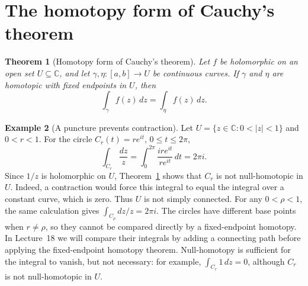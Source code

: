 \documentclass[11pt]{article}
\theoremstyle{plain}
\newtheorem{theorem}{Theorem}[section]
\theoremstyle{definition}
\newtheorem{example}[theorem]{Example}
\theoremstyle{remark}
\numberwithin{equation}{section}
\newcommand{\C}{\mathbb{C}}
\begin{document}
\newpage
\section{The homotopy form of Cauchy's theorem}
\begin{theorem}[Homotopy form of Cauchy's theorem]\label{thm:homotopy}
Let $f$ be holomorphic on an open set $U\subseteq\C$, and let
$\gamma,\eta\colon[a,b]\to U$ be continuous curves.
If $\gamma$ and $\eta$ are homotopic with fixed endpoints in $U$, then
\begin{equation}\label{eq:homotopy-invariance}
 \boxed{\displaystyle\int_\gamma f(z)\,dz=\int_\eta f(z)\,dz.}
\end{equation}
\end{theorem}

\begin{example}[A puncture prevents contraction]
Let $U=\{z\in\C:0<|z|<1\}$ and $0<r<1$. For the circle
$C_r(t)=re^{it}$, $0\leq t\leq2\pi$,
\[
 \int_{C_r}\frac{dz}{z}
 =\int_0^{2\pi}\frac{ire^{it}}{re^{it}}\,dt=2\pi i.
\]
Since $1/z$ is holomorphic on $U$, Theorem~\ref{thm:homotopy} shows that
$C_r$ is not null-homotopic in $U$. Indeed, a contraction would force this integral to equal the integral
over a constant curve, which is zero. Thus $U$ is not simply connected.
For any $0<\rho<1$, the same calculation gives
$\int_{C_\rho} dz/z=2\pi i$. The circles have different base points
when $r\ne\rho$, so they cannot be compared directly by a
fixed-endpoint homotopy. In Lecture~18 we will compare their integrals by adding a connecting
path before applying the fixed-endpoint homotopy theorem.
Null-homotopy is sufficient for the integral to vanish, but not
necessary: for example, $\int_{C_r}1\,dz=0$, although $C_r$ is not null-homotopic in $U$.

\begin{center}
\end{center}

\end{example}
\end{document}

